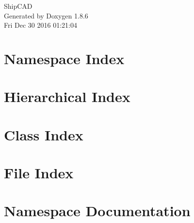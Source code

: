 \documentclass[twoside]{book}
\newcommand{\clearemptydoublepage}{%
  \newpage{\pagestyle{empty}\cleardoublepage}%
}
\begin{document}
\hypersetup{pageanchor=false}
\begin{titlepage}
\vspace*{7cm}
\begin{center}%
{\Large Ship\-C\-A\-D }\\
\vspace*{1cm}
{\large Generated by Doxygen 1.8.6}\\
\vspace*{0.5cm}
{\small Fri Dec 30 2016 01:21:04}\\
\end{center}
\end{titlepage}
\clearemptydoublepage
\tableofcontents
\clearemptydoublepage
{}
\hypersetup{pageanchor=true}

\chapter{Namespace Index}

\chapter{Hierarchical Index}

\chapter{Class Index}

\chapter{File Index}

\chapter{Namespace Documentation}


\end{document}
